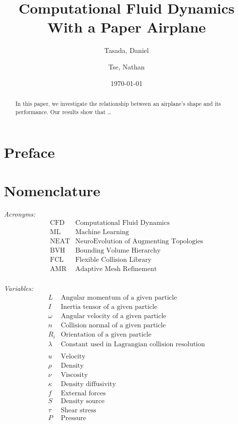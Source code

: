\documentclass[a4paper,12pt,titlepage]{article}
\title{Computational Fluid Dynamics With a Paper Airplane}
\author{
  Tasada, Daniel\\
  \and
  Tse, Nathan\\
}
\date{\today}
\begin{document}
\maketitle
\begin{abstract}
	In this paper, we investigate the relationship between an airplane's shape
	and its performance. Our results show that \dots
\end{abstract}

\pagebreak
\section{Preface}
\ipsum[1]

\pagebreak

\tableofcontents
\pagebreak

\section{Nomenclature}
\textit{Acronyms:}
\[
	\begin{array}{ll}
		\text{CFD} & \text{Computational Fluid Dynamics} \\
		\text{ML} & \text{Machine Learning} \\
		\text{NEAT} & \text{NeuroEvolution of Augmenting Topologies} \\
		\text{BVH} & \text{Bounding Volume Hierarchy} \\
		\text{FCL} & \text{Flexible Collision Library} \\
		\text{AMR} & \text{Adaptive Mesh Refinement} \\
	\end{array}
\]

\textit{Variables:}
\[
	\begin{array}{ll}
		L & \text{Angular momentum of a given particle} \\
		I & \text{Inertia tensor of a given particle} \\
		\omega & \text{Angular velocity of a given particle} \\
		n & \text{Collision normal of a given particle} \\
		R_i & \text{Orientation of a given particle} \\
		\lambda & \text{Constant used in Lagrangian collision resolution} \\

		\\

		u & \text{Velocity} \\
		\rho & \text{Density} \\
		\nu & \text{Viscosity} \\
		\kappa & \text{Density diffusivity} \\
		f & \text{External forces} \\
		S & \text{Density source}

		\\
		
		\tau & \text{Shear stress} \\
		P & \text{Pressure} \\
	\end{array}
\]
\pagebreak
\end{document}
